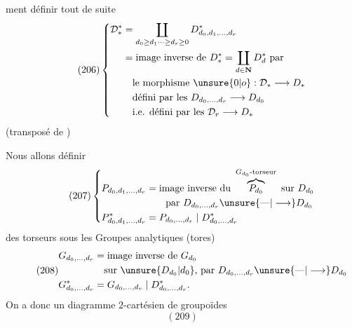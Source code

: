 ment définir tout de suite
\[
\tag{206}
\left\{\begin{aligned}
\mathcal D_*^*&=\coprod_{d_0\geq d_1\cdots\geq d_r\geq0}D^*_{d_0,d_1,\ldots,d_r}\\
&=\text{image inverse de }D_*^*=\coprod_{d\in\mathbf N}D_d^*\text{ par}\\
&\quad\text{le morphisme }\unsure{0|o}:\mathcal D_*\longrightarrow D_*\\
&\quad\text{défini par les }D_{d_0,\ldots,d_r}\longrightarrow D_{d_0}\\
&\quad\text{i.e. défini par les }\mathcal D_r\longrightarrow D_*
\end{aligned}\right.
\]
(transposé de
)

Nous allons définir
\[
\tag{207}
\left\{\begin{aligned}
P_{d_0,d_1,\ldots,d_r}&=\text{image inverse du }\overbrace{P_{d_0}}^{G_{d_0}\text{-torseur}}\text{ sur }D_{d_0}\\
&\qquad\text{par }D_{d_0,\ldots,d_r}\unsure{\text{---}|\longrightarrow}D_{d_0}\\
P^*_{d_0,d_1,\ldots,d_r}&=P_{d_0,\ldots,d_r}\mid D^*_{d_0,\ldots,d_r}
\end{aligned}\right.
\]
 des torseurs sous les Groupes analytiques
(tores)
\[
\tag{208}
\begin{aligned}
G_{d_0,\ldots,d_r}&=\text{image inverse de }G_{d_0}\\
&\quad\text{sur }\unsure{D_{d_0}|d_0}\text{, par }D_{d_0,\ldots,d_r}\unsure{\text{---}|\longrightarrow}D_{d_0}\\
G^*_{d_0,\ldots,d_r}&=G_{d_0,\ldots,d_r}\mid D^*_{d_0,\ldots,d_r}.
\end{aligned}
\]
On a donc un diagramme $2$-cartésien de groupoïdes
\[
(209)
\]
